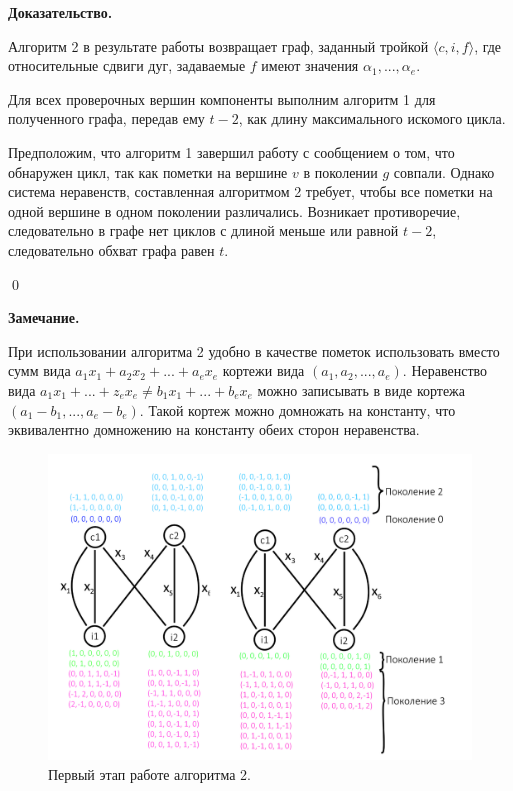 \documentclass[14pt]{mmcs-article}
\begin{document}
\textbf{Доказательство.}

Алгоритм 2 в результате работы возвращает граф, заданный тройкой $\langle c, i, f \rangle$, где относительные сдвиги дуг, задаваемые $f$ имеют значения $\alpha_1, ..., \alpha_e$.

Для всех проверочных вершин компоненты выполним алгоритм 1 для полученного графа, передав ему $t - 2$, как длину максимального искомого цикла. 

Предположим, что алгоритм 1 завершил работу с сообщением о том, что обнаружен цикл, так как пометки на вершине $v$ в поколении $g$ совпали. Однако система неравенств, составленная алгоритмом 2 требует, чтобы все пометки на одной вершине в одном поколении различались. Возникает противоречие, следовательно в графе нет циклов с длиной меньше или равной $t - 2$, следовательно обхват графа равен $t$.

\qed

\textbf{Замечание.}

При использовании алгоритма 2 удобно в качестве пометок использовать вместо сумм вида $a_1 x_1 + a_2 x_2 + ... + a_e x_e$ кортежи вида $(a_1, a_2, ..., a_e)$. Неравенство вида $a_1 x_1 + ... + z_e x_e \neq b_1 x_1 + ... + b_e x_e$ можно записывать в виде кортежа $(a_1 - b_1, ..., a_e - b_e)$. Такой кортеж можно домножать на константу, что эквивалентно домножению на константу обеих сторон неравенства. 

\begin{figure}[H]
  \centering
  \includegraphics[scale=0.5]{Fig_6.png}
  \caption{ Первый этап работе алгоритма 2. }
  \label{image:6}
\end{figure}
\end{document}
